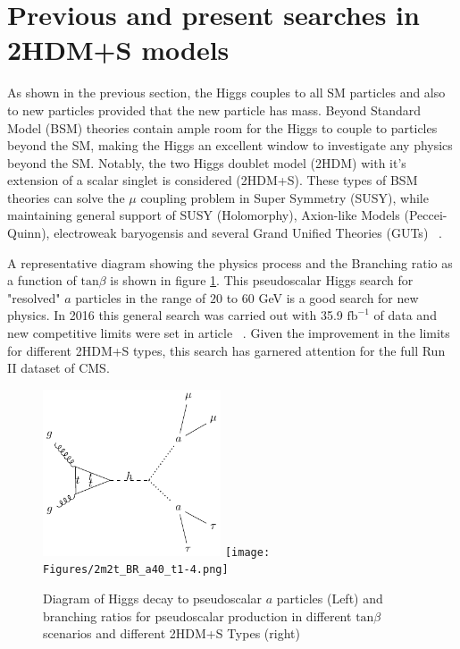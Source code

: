 \section{Previous and present searches in 2HDM+S models}

As shown in the previous section, the Higgs couples to all SM particles and also to new particles provided that the new particle has mass.  
Beyond Standard Model (BSM) theories contain ample room for the Higgs to couple to particles beyond the SM, making the Higgs an excellent window to investigate any physics beyond the SM.
Notably, the two Higgs doublet model (2HDM) with it's extension of a scalar singlet is considered (2HDM+S).
These types of BSM theories can solve the $\mu$ coupling problem in Super Symmetry (SUSY), while maintaining general support of SUSY (Holomorphy), Axion-like Models (Peccei-Quinn), electroweak baryogensis and several Grand Unified Theories (GUTs) ~\cite{Branco_2012}.

A representative diagram showing the physics process and the Branching ratio as a function of $\text{tan}\beta$ is shown in figure \ref{fig:feynman_haa}. This pseudoscalar Higgs search for "resolved" $a$ particles in the range of $20$ to $60$ GeV is a good search for new physics.
In 2016 this general search was carried out with 35.9 $\text{fb}^{-1}$ of data and new competitive limits were set in article ~\cite{CMS-HIG-17-029}.
Given the improvement in the limits for different 2HDM+S types, this search has garnered attention for the full Run II dataset of CMS.

\begin{figure}[ht!b]
  \includegraphics[width=0.47\textwidth]{Figures/feynman_haa.pdf}
  \texttt{[image: Figures/2m2t\_BR\_a40\_t1-4.png]}\\
    \caption{\label{fig:feynman_haa} Diagram of Higgs decay to pseudoscalar $a$ particles (Left) and branching ratios for pseudoscalar production in different $\text{tan}\beta$ scenarios and different 2HDM+S Types (right)}
\end{figure}

